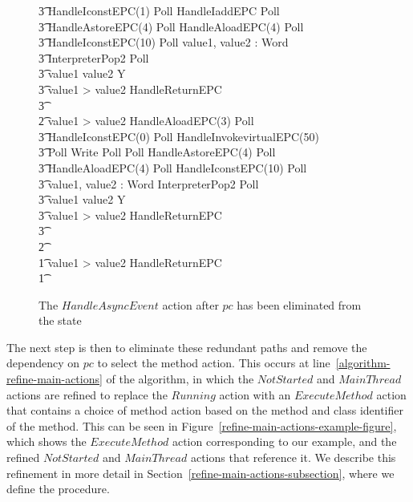 \begin{figure}[p!]
\begin{circus}
    \t3 HandleIconstEPC(1) \circseq Poll \circseq HandleIaddEPC \circseq Poll \circseq \\
    \t3 HandleAstoreEPC(4) \circseq Poll \circseq HandleAloadEPC(4) \circseq Poll \circseq \\
    \t3 HandleIconstEPC(10) \circseq Poll \circseq \circvar value1, value2 : Word \circspot \\
    \t3 InterpreterPop2 \circseq Poll \circseq \\
    \t3 \circif value1 \leq value2 \circthen Y \\
    \t3 {} \circelse value1 > value2 \circthen HandleReturnEPC \\
    \t3 \circfi \\
    \t2 {} \circelse value1 > value2 \circthen HandleAloadEPC(3) \circseq Poll \circseq \\
    \t3 HandleIconstEPC(0) \circseq Poll \circseq HandleInvokevirtualEPC(50) \circseq \\
    \t3 Poll \circseq Write \circseq Poll \circseq Poll \circseq HandleAstoreEPC(4) \circseq Poll \circseq \\
    \t3 HandleAloadEPC(4) \circseq Poll \circseq HandleIconstEPC(10) \circseq Poll \circseq \\
    \t3 \circvar value1, value2 : Word \circspot InterpreterPop2 \circseq Poll \circseq \\
    \t3 \circif value1 \leq value2 \circthen Y \\
    \t3 {} \circelse value1 > value2 \circthen  HandleReturnEPC \\
    \t3 \circfi \\
    \t2 \circfi \\
    \t1 {} \circelse value1 > value2 \circthen  HandleReturnEPC \\
    \t1 \circfi \\
  \end{circus}
  \caption{The $HandleAsyncEvent$ action after $pc$ has been eliminated from the state}
  \label{pc-elimination-HandleAsyncEvent-example-figure}
\end{figure}

The next step is then to eliminate these redundant paths and remove
the dependency on $pc$ to select the method action.
This occurs at line~\ref{algorithm-refine-main-actions} of the
algorithm, in which the $NotStarted$ and $MainThread$ actions are
refined to replace the $Running$ action with an $ExecuteMethod$ action
that contains a choice of method action based on the method and class
identifier of the method.
This can be seen in Figure~\ref{refine-main-actions-example-figure},
which shows the $ExecuteMethod$ action corresponding to our example,
and the refined $NotStarted$ and $MainThread$ actions that reference
it.
We describe this refinement in more detail in
Section~\ref{refine-main-actions-subsection}, where we define the
 procedure.

